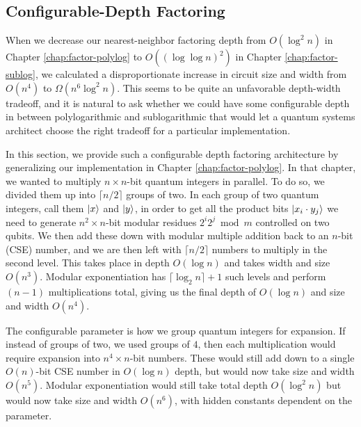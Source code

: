 
\subsection{Configurable-Depth Factoring}
\label{subsec:cohere-factor}

When we decrease our nearest-neighbor factoring depth from $O(\log^2 n)$
in Chapter \ref{chap:factor-polylog} to $O((\log\log n)^2)$ in
Chapter \ref{chap:factor-sublog}, we calculated a disproportionate
increase in circuit size and width from
$O(n^4)$ to $\Omega(n^6\log^2 n)$. This seems to be quite an
unfavorable depth-width tradeoff, and it is natural to ask whether
we could have some configurable depth in between
polylogarithmic and sublogarithmic that would let a quantum
systems architect choose the right tradeoff for a particular
implementation.

In this section, we provide such a configurable depth
factoring architecture by generalizing our implementation in
Chapter \ref{chap:factor-polylog}. In that chapter, we
wanted to multiply $n\times n$-bit quantum integers in parallel.
To do so, we divided them up into $\lceil n/2 \rceil$ groups of two.
In each group of two quantum integers, call them $\left\vert{x}\right\rangle$ and
$\left\vert{y}\right\rangle$, in order to get all the product bits
$\left\vert{x_i\cdot y_j}\right\rangle$ we need to generate $n^2 \times n$-bit modular residues
$2^i 2^j \bmod m$ controlled on two qubits. We then add these
down with modular multiple addition back to an $n$-bit (CSE) number,
and we are then left with $\lceil n/2 \rceil$ numbers to multiply in
the second level. This takes place in depth $O(\log n)$ and takes
width and size $O(n^3)$.
Modular exponentiation has $\lceil \log_2 n \rceil + 1$ such
levels and perform $(n-1)$ multiplications total, giving us the
final depth of $O(\log n)$ and size and width $O(n^4)$.

The configurable parameter is how we group quantum integers for
expansion. If instead of groups of two, we used groups of
$4$, then each multiplication would require expansion
into $n^4 \times n$-bit numbers. These would still add down to
a single $O(n)$-bit CSE number in $O(\log n)$ depth, but
would now take size and width $O(n^5)$. Modular exponentiation
would still take total depth $O(\log^2 n)$ but would now take
size and width $O(n^6)$, with hidden constants dependent on
the parameter.

